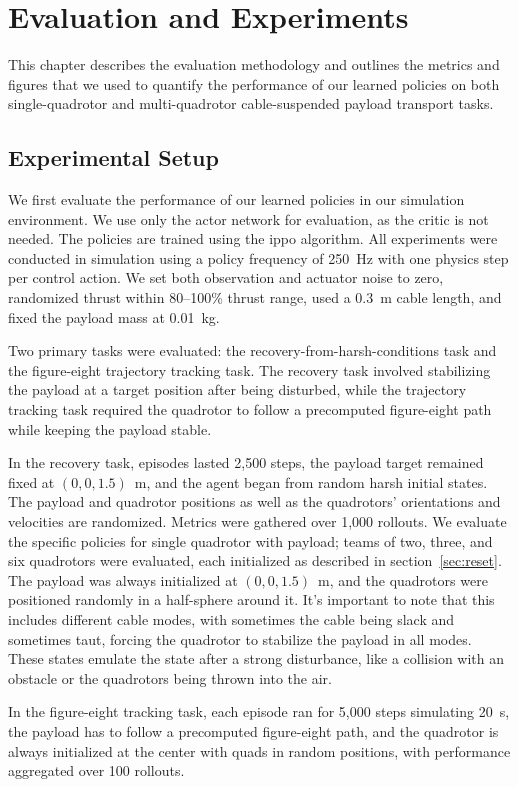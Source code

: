 \chapter{Evaluation and Experiments}
This chapter describes the evaluation methodology and outlines the metrics and figures that we used to quantify the performance of our learned policies on both single-quadrotor and multi-quadrotor cable-suspended payload transport tasks.

\section{Experimental Setup}
We first evaluate the performance of our learned policies in our simulation environment. We use only the actor network for evaluation, as the critic is not needed. The policies are trained using the \gls{ippo} algorithm.  
All experiments were conducted in simulation using a policy frequency of 250~Hz with one physics step per control action. We set both observation and actuator noise to zero, randomized thrust within 80--100\% thrust range, used a 0.3~m cable length, and fixed the payload mass at 0.01~kg.

Two primary tasks were evaluated: the recovery-from-harsh-conditions task and the figure-eight trajectory tracking task. The recovery task involved stabilizing the payload at a target position after being disturbed, while the trajectory tracking task required the quadrotor to follow a precomputed figure-eight path while keeping the payload stable.

In the recovery task, episodes lasted 2,500 steps, the payload target remained fixed at $(0,0,1.5)$~m, and the agent began from random harsh initial states. The payload and quadrotor positions as well as the quadrotors' orientations and velocities are randomized. Metrics were gathered over 1,000 rollouts. We evaluate the specific policies for single quadrotor with payload; teams of two, three, and six quadrotors were evaluated, each initialized as described in section~\ref{sec:reset}. The payload was always initialized at $(0,0,1.5)$~m, and the quadrotors were positioned randomly in a half-sphere around it. It's important to note that this includes different cable modes, with sometimes the cable being slack and sometimes taut, forcing the quadrotor to stabilize the payload in all modes. These states emulate the state after a strong disturbance, like a collision with an obstacle or the quadrotors being thrown into the air.

In the figure-eight tracking task, each episode ran for 5,000 steps simulating 20~s, the payload has to follow a precomputed figure-eight path, and the quadrotor is always initialized at the center with quads in random positions, with performance aggregated over 100 rollouts.

